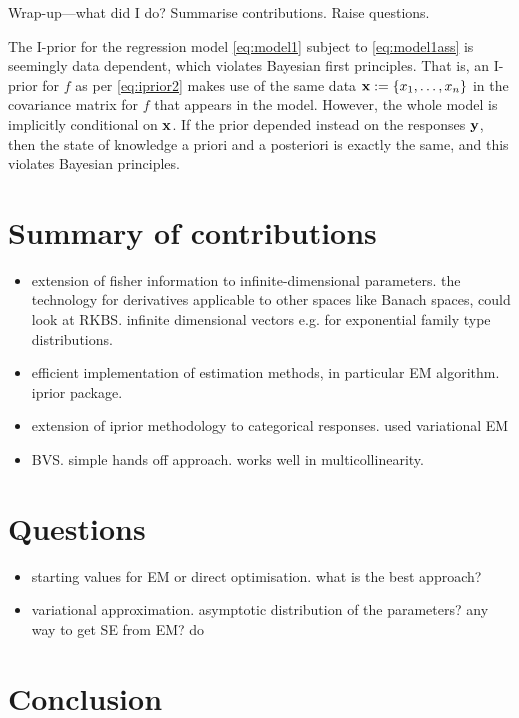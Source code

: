 \documentclass[a4paper,showframe,11pt]{report}
\begin{document}

Wrap-up---what did I do? Summarise contributions. Raise questions.


The I-prior for the regression model \cref{eq:model1} subject to \cref{eq:model1ass} is seemingly data dependent, which violates Bayesian first principles.
That is, an I-prior for $f$ as per \cref{eq:iprior2} makes use of the same data ${\mathbf x}:=\{x_1,\dots,x_n\}$ in the covariance matrix for $f$ that appears in the model.
However, the whole model is implicitly conditional on ${\mathbf x}$.
If the prior depended instead on the responses ${\mathbf y}$, then the state of knowledge a priori and a posteriori is exactly the same, and this violates Bayesian principles.

\section{Summary of contributions}

\begin{itemize}
  \item extension of fisher information to infinite-dimensional parameters. the technology for derivatives applicable to other spaces like Banach spaces, could look at RKBS. infinite dimensional vectors e.g. for exponential family type distributions. 
  \item efficient implementation of estimation methods, in particular EM algorithm. iprior package.
  \item extension of iprior methodology to categorical responses. used variational EM
  \item BVS. simple hands off approach. works well in multicollinearity.
\end{itemize}

\section{Questions}

\begin{itemize}
  \item starting values for EM or direct optimisation. what is the best approach?
  \item variational approximation. asymptotic distribution of the parameters? any way to get SE from EM? do 
\end{itemize}

\section{Conclusion}

\hClosingStuffStandalone
\end{document}
